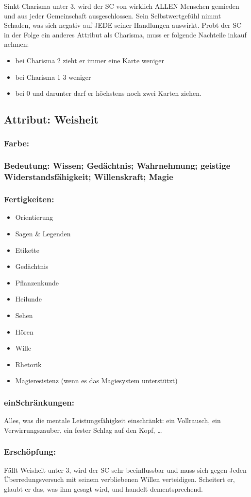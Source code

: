 Sinkt Charisma unter 3, wird der SC von wirklich ALLEN Menschen gemieden und aus jeder Gemeinschaft ausgeschlossen. Sein Selbstwertgefühl nimmt Schaden, was sich negativ auf JEDE seiner Handlungen auswirkt. Probt der SC in der Folge ein anderes Attribut als Charisma, muss er folgende Nachteile inkauf nehmen:
\begin{itemize}
\item bei Charisma 2 zieht er immer eine Karte weniger
\item bei Charisma 1 3 weniger
\item bei 0 und darunter darf er höchstens noch zwei Karten ziehen.
\end{itemize}

\subsection{Attribut: Weisheit}

\subsubsection{Farbe: \karo}

\subsubsection{Bedeutung: Wissen; Gedächtnis; Wahrnehmung; geistige Widerstandsfähigkeit; Willenskraft; Magie}

\subsubsection{Fertigkeiten:}
\begin{itemize}
\item Orientierung
\item Sagen \& Legenden
\item Etikette
\item Gedächtnis
\item Pflanzenkunde
\item Heilunde
\item Sehen
\item Hören
\item Wille
\item Rhetorik
\item Magieresistenz (wenn es das Magiesystem unterstützt)
\end{itemize}

\subsubsection{einSchränkungen:}

Alles, was die mentale Leistungsfähigkeit einschränkt: ein Vollrausch, ein Verwirrungszauber, ein fester Schlag auf den Kopf, \dots

\subsubsection{Erschöpfung:}

Fällt Weisheit unter 3, wird der SC sehr beeinflussbar und muss sich gegen Jeden Überredungsversuch mit seinem verbliebenen Willen verteidigen. Scheitert er, glaubt er das, was ihm gesagt wird, und handelt dementsprechend.
